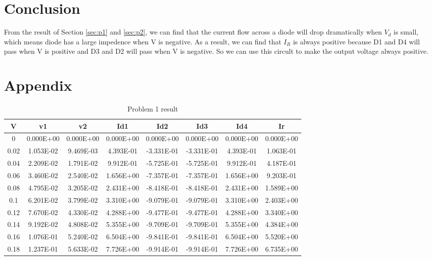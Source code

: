 \documentclass{article}
\begin{document}
\section{Conclusion}
From the result of Section \ref{sec:p1} and \ref{sec:p2}, we can find that the current flow across a diode will drop dramatically when $V_d$ is 
small, which means diode has a large impedence when V is negative. As a result,  we can find that $I_{R}$ is always positive because D1 and D4 will
pass when V is positive and D3 and D2 will pass when V is negative. So we can use this circult to make the output voltage always positive.


\section{Appendix}
\begin{center}
    \begin{longtable}{|c|c|c|c|c|c|c|c|}
    \caption{Problem 1 result} \label{tab:problem 1} \\
        \hline
        V & v1 & v2 & Id1 & Id2 & Id3 & Id4 & Ir \\ \hline
        0 & 0.000E+00 & 0.000E+00 & 0.000E+00 & 0.000E+00 & 0.000E+00 & 0.000E+00 & 0.000E+00 \\ \hline
        0.02 & 1.053E-02 & 9.469E-03 & 4.393E-01 & -3.331E-01 & -3.331E-01 & 4.393E-01 & 1.063E-01 \\ \hline
        0.04 & 2.209E-02 & 1.791E-02 & 9.912E-01 & -5.725E-01 & -5.725E-01 & 9.912E-01 & 4.187E-01 \\ \hline
        0.06 & 3.460E-02 & 2.540E-02 & 1.656E+00 & -7.357E-01 & -7.357E-01 & 1.656E+00 & 9.203E-01 \\ \hline
        0.08 & 4.795E-02 & 3.205E-02 & 2.431E+00 & -8.418E-01 & -8.418E-01 & 2.431E+00 & 1.589E+00 \\ \hline
        0.1 & 6.201E-02 & 3.799E-02 & 3.310E+00 & -9.079E-01 & -9.079E-01 & 3.310E+00 & 2.403E+00 \\ \hline
        0.12 & 7.670E-02 & 4.330E-02 & 4.288E+00 & -9.477E-01 & -9.477E-01 & 4.288E+00 & 3.340E+00 \\ \hline
        0.14 & 9.192E-02 & 4.808E-02 & 5.355E+00 & -9.709E-01 & -9.709E-01 & 5.355E+00 & 4.384E+00 \\ \hline
        0.16 & 1.076E-01 & 5.240E-02 & 6.504E+00 & -9.841E-01 & -9.841E-01 & 6.504E+00 & 5.520E+00 \\ \hline
        0.18 & 1.237E-01 & 5.633E-02 & 7.726E+00 & -9.914E-01 & -9.914E-01 & 7.726E+00 & 6.735E+00 \\ \hline

\end{longtable}
\end{center}
\end{document}
